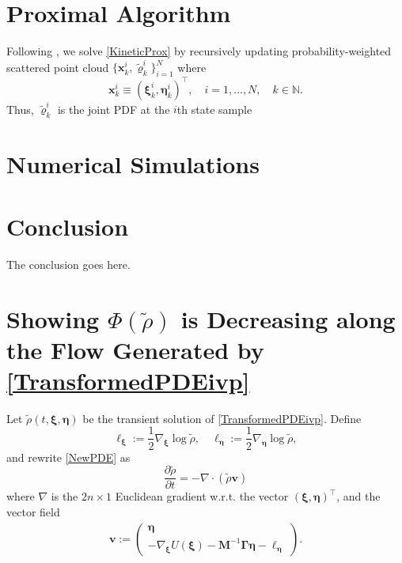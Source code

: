 \documentclass[10pt,twocolumn]{IEEEtran}
\begin{document}


\section{Proximal Algorithm}\label{sec:ProxAlgo}
Following \cite{caluya2019TAC}, we solve \eqref{KineticProx} by recursively updating probability-weighted scattered point cloud $\{\bm{x}_{k}^{i},\tilde{\varrho}_{k}^{i}\}_{i=1}^{N}$ where 
$$\bm{x}_{k}^{i}\equiv\left(\bm{\xi}_{k}^{i},\bm{\eta}_{k}^{i}\right)^{\!\top}, \quad i=1,\hdots,N, \quad k\in\mathbb{N}.$$
Thus, $\tilde{\varrho}_{k}^{i}$ is the joint PDF at the $i$th state sample 





\section{Numerical Simulations}\label{sec:NumericalSimulations}



\section{Conclusion}\label{sec:conclusion}
The conclusion goes here.


\appendices
\section{Showing $\Phi(\tilde{\rho})$ is Decreasing along the Flow Generated by \eqref{TransformedPDEivp}}\label{AppLyap}
Let $\tilde{\rho}(t,\bm{\xi},\bm{\eta})$ be the transient solution of \eqref{TransformedPDEivp}. Define
$$\bm{\ell}_{\bm{\xi}} := \frac{1}{2}\nabla_{\bm{\xi}}\log\tilde{\rho}, \quad \bm{\ell}_{\bm{\eta}} := \frac{1}{2}\nabla_{\bm{\eta}}\log\tilde{\rho},$$
and rewrite \eqref{NewPDE} as
$$\dfrac{\partial\tilde{\rho}}{\partial t} = - \nabla\cdot\left(\tilde{\rho}\bm{v}\right)$$
where $\nabla$ is the $2n\times 1$ Euclidean gradient w.r.t. the vector $(\bm{\xi},\bm{\eta})^{\top}$, and the vector field
\begin{align}
\bm{v} := \begin{pmatrix}
 \bm{\eta}\\
 -\nabla_{\bm{\xi}}U(\bm{\xi}) - \bm{M}^{-1}\bm{\Gamma}\bm{\eta} - \bm{\ell}_{\bm{\eta}}	
 \end{pmatrix}.
\label{defvectorfieldv}	
\end{align}
\end{document}
